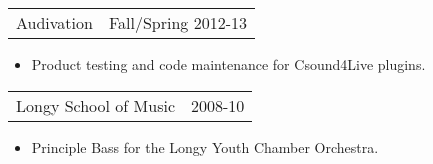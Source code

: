 \documentclass[margin]{res}
\begin{document}
\begin{resume}
\begin{tabular}{p{3in} r} %
Audivation&   Fall/Spring 2012-13
\end{tabular}	
\begin{itemize} %
\item[] Product testing and code maintenance for Csound4Live plugins. 
\end{itemize} 

\begin{tabular}{p{3in} r} %
Longy School of Music&  2008-10
\end{tabular}
\begin{itemize}					        
\item[] Principle Bass for the Longy Youth Chamber Orchestra.
\end{itemize}
\end{resume} 
\end{document}
